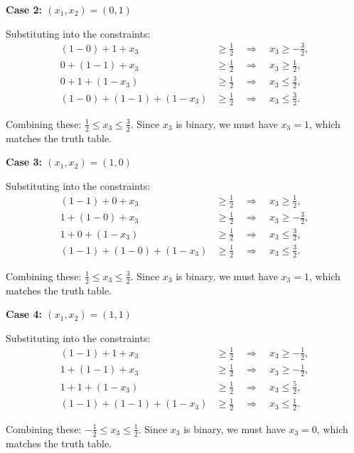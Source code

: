 \documentclass{article}
\begin{document}
\begin{enumerate}
\begin{enumerate}
\textbf{Case 2: $(x_1, x_2) = (0, 1)$}

Substituting into the constraints:
\begin{align*}
(1 - 0) + 1 + x_3 &\geq \frac{1}{2} \quad \Rightarrow \quad x_3 \geq -\frac{3}{2}, \\
0 + (1 - 1) + x_3 &\geq \frac{1}{2} \quad \Rightarrow \quad x_3 \geq \frac{1}{2}, \\
0 + 1 + (1 - x_3) &\geq \frac{1}{2} \quad \Rightarrow \quad x_3 \leq \frac{3}{2}, \\
(1 - 0) + (1 - 1) + (1 - x_3) &\geq \frac{1}{2} \quad \Rightarrow \quad x_3 \leq \frac{3}{2}.
\end{align*}

Combining these: $\frac{1}{2} \leq x_3 \leq \frac{3}{2}$. Since $x_3$ is binary, we must have $x_3 = 1$, which matches the truth table.

\textbf{Case 3: $(x_1, x_2) = (1, 0)$}

Substituting into the constraints:
\begin{align*}
(1 - 1) + 0 + x_3 &\geq \frac{1}{2} \quad \Rightarrow \quad x_3 \geq \frac{1}{2}, \\
1 + (1 - 0) + x_3 &\geq \frac{1}{2} \quad \Rightarrow \quad x_3 \geq -\frac{3}{2}, \\
1 + 0 + (1 - x_3) &\geq \frac{1}{2} \quad \Rightarrow \quad x_3 \leq \frac{3}{2}, \\
(1 - 1) + (1 - 0) + (1 - x_3) &\geq \frac{1}{2} \quad \Rightarrow \quad x_3 \leq \frac{3}{2}.
\end{align*}

Combining these: $\frac{1}{2} \leq x_3 \leq \frac{3}{2}$. Since $x_3$ is binary, we must have $x_3 = 1$, which matches the truth table.

\textbf{Case 4: $(x_1, x_2) = (1, 1)$}

Substituting into the constraints:
\begin{align*}
(1 - 1) + 1 + x_3 &\geq \frac{1}{2} \quad \Rightarrow \quad x_3 \geq -\frac{1}{2}, \\
1 + (1 - 1) + x_3 &\geq \frac{1}{2} \quad \Rightarrow \quad x_3 \geq -\frac{1}{2}, \\
1 + 1 + (1 - x_3) &\geq \frac{1}{2} \quad \Rightarrow \quad x_3 \leq \frac{5}{2}, \\
(1 - 1) + (1 - 1) + (1 - x_3) &\geq \frac{1}{2} \quad \Rightarrow \quad x_3 \leq \frac{1}{2}.
\end{align*}

Combining these: $-\frac{1}{2} \leq x_3 \leq \frac{1}{2}$. Since $x_3$ is binary, we must have $x_3 = 0$, which matches the truth table.


\end{enumerate}
\end{enumerate}
\end{document}
